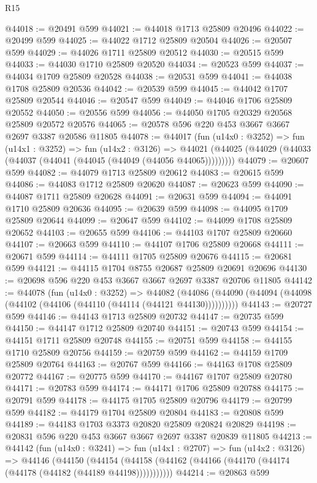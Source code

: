 \begin{lexlean}{R15}
\begin{coremodule}
@44018 := @20491 @599
@44021 := @44018 @1713 @25809 @20496
@44022 := @20499 @599
@44025 := @44022 @1712 @25809 @20504
@44026 := @20507 @599
@44029 := @44026 @1711 @25809 @20512
@44030 := @20515 @599
@44033 := @44030 @1710 @25809 @20520
@44034 := @20523 @599
@44037 := @44034 @1709 @25809 @20528
@44038 := @20531 @599
@44041 := @44038 @1708 @25809 @20536
@44042 := @20539 @599
@44045 := @44042 @1707 @25809 @20544
@44046 := @20547 @599
@44049 := @44046 @1706 @25809 @20552
@44050 := @20556 @599
@44056 := @44050 @1705 @20329 @20568 @25809 @20572 @20576
@44065 := @20578 @596 @220 @453 @3667 @3667 @2697 @3387 @20586 @11805
@44078 := @44017
    (fun (u14x0 : @3252) =>
    fun (u14x1 : @3252) =>
    fun (u14x2 : @3126) =>
    @44021 (@44025 (@44029 (@44033 (@44037 (@44041 (@44045 (@44049 (@44056 @44065)))))))))
@44079 := @20607 @599
@44082 := @44079 @1713 @25809 @20612
@44083 := @20615 @599
@44086 := @44083 @1712 @25809 @20620
@44087 := @20623 @599
@44090 := @44087 @1711 @25809 @20628
@44091 := @20631 @599
@44094 := @44091 @1710 @25809 @20636
@44095 := @20639 @599
@44098 := @44095 @1709 @25809 @20644
@44099 := @20647 @599
@44102 := @44099 @1708 @25809 @20652
@44103 := @20655 @599
@44106 := @44103 @1707 @25809 @20660
@44107 := @20663 @599
@44110 := @44107 @1706 @25809 @20668
@44111 := @20671 @599
@44114 := @44111 @1705 @25809 @20676
@44115 := @20681 @599
@44121 := @44115 @1704 @8755 @20687 @25809 @20691 @20696
@44130 := @20698 @596 @220 @453 @3667 @3667 @2697 @3387 @20706 @11805
@44142 := @44078
    (fun (u14x0 : @3252) =>
    @44082 (@44086 (@44090 (@44094 (@44098 (@44102 (@44106 (@44110 (@44114 (@44121 @44130))))))))))
@44143 := @20727 @599
@44146 := @44143 @1713 @25809 @20732
@44147 := @20735 @599
@44150 := @44147 @1712 @25809 @20740
@44151 := @20743 @599
@44154 := @44151 @1711 @25809 @20748
@44155 := @20751 @599
@44158 := @44155 @1710 @25809 @20756
@44159 := @20759 @599
@44162 := @44159 @1709 @25809 @20764
@44163 := @20767 @599
@44166 := @44163 @1708 @25809 @20772
@44167 := @20775 @599
@44170 := @44167 @1707 @25809 @20780
@44171 := @20783 @599
@44174 := @44171 @1706 @25809 @20788
@44175 := @20791 @599
@44178 := @44175 @1705 @25809 @20796
@44179 := @20799 @599
@44182 := @44179 @1704 @25809 @20804
@44183 := @20808 @599
@44189 := @44183 @1703 @3373 @20820 @25809 @20824 @20829
@44198 := @20831 @596 @220 @453 @3667 @3667 @2697 @3387 @20839 @11805
@44213 := @44142
    (fun (u14x0 : @3241) =>
    fun (u14x1 : @2707) =>
    fun (u14x2 : @3126) =>
    @44146
      (@44150
        (@44154 (@44158 (@44162 (@44166 (@44170 (@44174 (@44178 (@44182 (@44189 @44198)))))))))))
@44214 := @20863 @599

\end{coremodule}
\end{lexlean}
